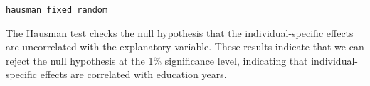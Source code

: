 
\newpage


\begin{verbatim}
hausman fixed random
\end{verbatim}


The Hausman test checks the null hypothesis that the individual-specific effects are uncorrelated with the explanatory variable. These results indicate that we can reject the null hypothesis at the 1\% significance level, indicating that individual-specific effects are correlated with education years.